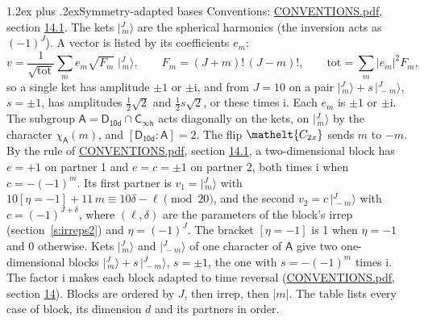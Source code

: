 \documentclass[10pt,a4paper]{article}
\makeatletter
\renewcommand\section{\@startsection{section}{1}{\z@}{-3ex plus -1ex minus -.2ex}%
  {1.2ex plus .2ex}{\normalfont\large\sffamily\bfseries\color{parttitle}}}
\numberwithin{equation}{section}
\newcommand{\eltfont}[1]{{\let\sigma\eltsigma\mathelt{#1}}}
\newcommand{\grp}[1]{\mathsf{#1}}
\newcommand{\elt}[1]{\eltfont{#1}}
\newcommand{\grpindex}[2]{[#1 : #2]}
\newcommand{\iverson}[1]{[#1]}
\newcommand{\iunit}{\mathrm{i}}
\newcommand{\chiA}{\chi_{\grp{A}}}
\newcommand{\jm}[2]{\bigl\lvert{}^{#1}_{\,#2}\bigr\rangle}
\makeatother
\begin{document}
\section{Symmetry-adapted bases}\label{s:bases}
Conventions: \href{../../CONVENTIONS.pdf}{CONVENTIONS.pdf}, section \href{../../CONVENTIONS.pdf\#conv.14.1}{14.1}.
\leavevmode\label{n:index.m}\label{n:vector.ket}The kets $\jm{J}{m}$ are the spherical harmonics (the inversion acts as $(-1)^J$). \label{n:index.ketcoefficient}\label{n:vector.basis.symmetry}\label{n:index.ketweight}\label{n:index.total}A vector is listed by its coefficients $e_m$:
\begin{equation}\label{e:ket}v = \frac{1}{\sqrt{\mathrm{tot}}}\sum_m e_m\sqrt{F_m}\;\jm{J}{m},\qquad F_m = (J+m)!\,(J-m)!,\qquad \mathrm{tot} = \sum_m |e_m|^2F_m,\end{equation}
\leavevmode\label{n:index.pair.sign}so a single ket has amplitude $\pm1$ or $\pm\iunit$, and from $J = 10$ on a pair $\jm{J}{m} + s\,\jm{J}{-m}$, $s = \pm1$, has amplitudes $\tfrac{1}{2}\sqrt{2}$ and $\tfrac{1}{2}s\sqrt{2}$, or these times $\iunit$. Each $e_m$ is $\pm1$ or $\pm\iunit$.
\leavevmode\label{n:group.A}\label{n:function.character.abelian}The subgroup $\grp{A} = \grp{D_{10d}}\cap\grp{C_{\infty h}}$ acts diagonally on the kets, on $\jm{J}{m}$ by the character $\chiA(m)$, and $\grpindex{\grp{D_{10d}}}{\grp{A}} = 2$. The flip $\elt{C_{2x}}$ sends $m$ to $-m$. \label{n:index.partner.sign}By the rule of \href{../../CONVENTIONS.pdf}{CONVENTIONS.pdf}, section \href{../../CONVENTIONS.pdf\#conv.14.1}{14.1}, a two-dimensional block has $e = +1$ on partner 1 and $e = c = \pm1$ on partner 2, both times $\iunit$ when $c = -(-1)^m$. \label{n:index.eta}Its first partner is $v_1 = \jm{J}{m}$ with $10\iverson{\eta = -1} + 11\,m \equiv 10\delta - \ell \pmod{20}$, and the second $v_2 = c\,\jm{J}{-m}$ with $c = (-1)^{J+\delta}$, where $(\ell, \delta)$ are the parameters of the block's irrep (section~\ref{s:irreps2}) and $\eta = (-1)^J$. The bracket $\iverson{\eta = -1}$ is 1 when $\eta = -1$ and 0 otherwise. Kets $\jm{J}{m}$ and $\jm{J}{-m}$ of one character of $\grp{A}$ give two one-dimensional blocks $\jm{J}{m} + s\,\jm{J}{-m}$, $s = \pm1$, the one with $s = -(-1)^m$ times $\iunit$. The factor $\iunit$ makes each block adapted to time reversal (\href{../../CONVENTIONS.pdf}{CONVENTIONS.pdf}, section \href{../../CONVENTIONS.pdf\#conv.14}{14}). Blocks are ordered by $J$, then irrep, then $|m|$.
\leavevmode\label{n:head.case}\label{n:head.partners}The table lists every case of block, its dimension $d$ and its partners in order.
\end{document}
